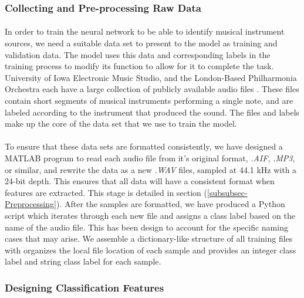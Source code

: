\documentclass[12pt,letterpaper]{article}
\begin{document}

\subsubsection{Collecting and Pre-processing Raw Data}

\paragraph*{}In order to train the neural network to be able to identify musical instrument sources, we need a suitable data set to present to the model as training and validation data. The model uses this data and corresponding labels in the training process to modify its function to allow for it to complete the task. University of Iowa Electronic Music Studio, and the London-Based Philharmonia Orchestra each have a large collection of publicly available audio files \cite{UnivIowa,Philharmonia}. These files contain short segments of musical instruments performing a single note, and are labeled according to the instrument that produced the sound. The files and labels make up the core of the data set that we use to train the model.

\paragraph*{}To ensure that these data sets are formatted consistently, we have designed a MATLAB program to read each audio file from it's original format, \textit{.AIF}, \textit{.MP3}, or similar, and rewrite the data as a new \textit{.WAV} files, sampled at 44.1 kHz with a 24-bit depth. This ensures that all data will have a consistent format when features are extracted. This stage is detailed in section (\ref{subsubsec-Preprocessing}). After the samples are formatted, we have produced a Python script which iterates through each new file and assigns a class label based on the name of the audio file. This has been design to account for the specific naming cases that may arise. We assemble a dictionary-like structure of all training files with organizes the local file location of each sample and provides an integer class label and string class label for each sample. 


\subsubsection{Designing Classification Features}
\end{document}
